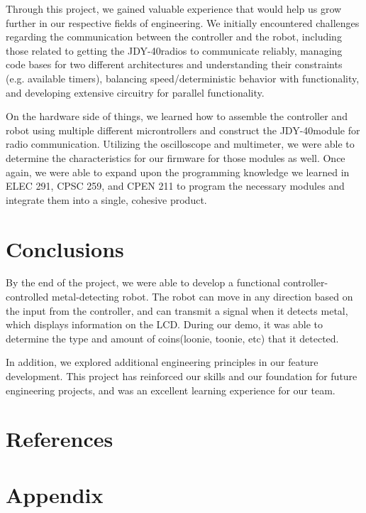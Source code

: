 \documentclass{article}
\begin{document}
Through this project, we gained valuable experience that would help us grow further in our respective fields of engineering. We initially encountered challenges regarding the communication between the controller and the robot, including those related to getting the JDY-40radios to communicate reliably, managing code bases for two different architectures and understanding their constraints (e.g. available timers), balancing speed/deterministic behavior with functionality, and developing extensive circuitry for parallel functionality.

On the hardware side of things, we learned how to assemble the controller and robot using multiple different microntrollers and construct the JDY-40module for radio communication. Utilizing the oscilloscope and multimeter, we were able to determine the characteristics for our firmware for those modules as well. Once again, we were able to expand upon the programming knowledge we learned in ELEC 291, CPSC 259, and CPEN 211 to program the necessary modules and integrate them into a single, cohesive product.


\section{Conclusions}
By the end of the project, we were able to develop a functional controller-controlled metal-detecting robot. The robot can move in any direction based on the input from the controller, and can transmit a signal when it detects metal, which displays information on the LCD. During our demo, it was able to determine the type and amount of coins(loonie, toonie, etc) that it detected.

In addition, we explored additional engineering principles in our feature development. This project has reinforced our skills and our foundation for future engineering projects, and was an excellent learning experience for our team.

\renewcommand{\refname}{}

\newpage

\section{References}
\begin{thebibliography}{10}


\end{thebibliography}

\clearpage
\section{Appendix}
\end{document}
